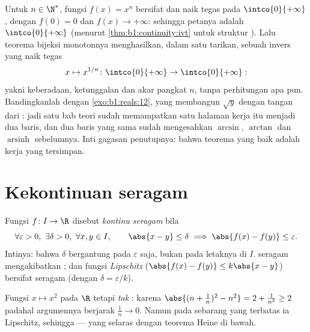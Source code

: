 \begin{example}\label{ex:b1:continuity:nthroot}
Untuk $n \in \N^*$, fungsi $f(x) = x^n$ bersifat  dan
naik tegas pada $\intco{0}{+\infty}$, dengan $f(0) = 0$ dan
$f(x) \to +\infty$: sehingga petanya adalah $\intco{0}{+\infty}$
(menurut \cref{thm:b1:continuity:ivt} untuk struktur ). Lalu
teorema bijeksi monotonnya menghasilkan, dalam satu tarikan, sebuah
invers \emph{} yang naik tegas
\[
x \mapsto x^{1/n} \colon \intco{0}{+\infty} \to
\intco{0}{+\infty} :
\]
yakni keberadaan, ketunggalan dan  akar pangkat $n$, tanpa
perhitungan apa pun. Bandingkanlah dengan \cref{exo:b1:reals:12}, yang membangun
$\sqrt y$ dengan tangan dari : jadi satu bab teori sudah
memampatkan satu halaman kerja itu menjadi dua baris, dan dua baris yang
sama sudah mengesahkan $\arcsin$, $\arctan$ dan
$\operatorname{arsinh}$ sebelumnya. Inti gagasan penutupnya: bahwa teorema
yang baik adalah kerja yang tersimpan.
\end{example}

\section{Kekontinuan seragam}

\begin{definition}\label{def:b1:continuity:uniform}
Fungsi $f \colon I \to \R$ disebut \emph{kontinu seragam} bila
\[
\forall \varepsilon > 0,\ \exists \delta > 0,\ \forall x, y \in I,
\qquad \abs{x - y} \leq \delta \implies \abs{f(x) - f(y)} \leq
\varepsilon .
\]
Intinya: bahwa $\delta$ bergantung pada $\varepsilon$ saja, bukan pada
letaknya di $I$.  seragam mengakibatkan ; dan
fungsi \emph{Lipschitz} ($\abs{f(x) - f(y)} \leq k \abs{x - y}$)
bersifat  seragam (dengan $\delta = \varepsilon/k$).
\end{definition}

\begin{example}\label{ex:b1:continuity:notuniform}
Fungsi $x \mapsto x^2$  pada $\R$ tetapi \emph{tak} : karena $\abs{(n + \frac 1n)^2 - n^2} = 2 + \frac{1}{n^2} \geq 2$
padahal argumennya berjarak $\frac 1n \to 0$. Namun pada sebarang
 yang terbatas ia Lipschitz, sehingga  ---
yang selaras dengan teorema Heine di bawah.
\end{example}

